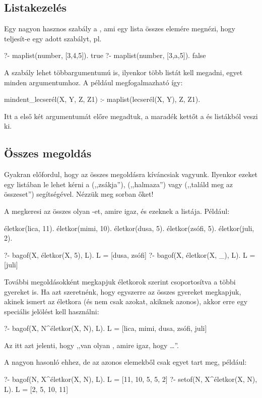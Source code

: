 \subsection*{Listakezelés}
Egy nagyon hasznos szabály a , ami egy
lista összes elemére megnézi, hogy teljesít-e egy
adott szabályt, pl.
\begin{query}
?- maplist(number, [3,4,5]).
true
?- maplist(number, [3,a,5]).
false
\end{query}
A szabály lehet többargumentumú is, ilyenkor több
listát kell megadni, egyet minden argumentumhoz. A
 például megfogalmazható így:
\begin{program}
mindent_lecserél(X, Y, Z, Z1) :-
    maplist(lecserél(X, Y), Z, Z1).
\end{program}
Itt a  első két argumentumát előre
megadtuk, a maradék kettőt a  és 
listákból veszi ki.

\subsection*{Összes megoldás}
Gyakran előfordul, hogy az összes megoldásra
kíváncsiak vagyunk. Ilyenkor ezeket egy listában le
lehet kérni a  (,,zsákja''), 
(,,halmaza'') vagy  (,,találd meg az
összeset'') segítségével. Nézzük meg sorban őket!

A  megkeresi az összes olyan
-et, amire  igaz, és  ezeknek a
listája. Például:
\begin{program}
életkor(lica, 11).
életkor(mimi, 10).
életkor(dusa, 5).
életkor(zsófi, 5).
életkor(juli, 2).
\end{program}
\begin{query}
?- bagof(X, életkor(X, 5), L).
L = [dusa, zsófi]
?- bagof(X, életkor(X, _), L).
L = [juli]
\end{query}
További megoldásokként megkapjuk életkorok szerint
csoportosítva a többi gyereket is. Ha azt
szeretnénk, hogy egyszerre az összes gyereket
megkapjuk, akinek ismert az életkora (és nem csak
azokat, akiknek azonos), akkor erre egy speciális
jelölést kell használni:
\begin{query}
?- bagof(X, N^életkor(X, N), L).
L = [lica, mimi, dusa, zsófi, juli]
\end{query}
Az  itt azt jelenti, hogy
,,van olyan , amire igaz, hogy \dots''.

A  nagyon hasonló ehhez, de az azonos
elemekből csak egyet tart meg, például:
\begin{query}
?- bagof(N, X^életkor(X, N), L).
L = [11, 10, 5, 5, 2]
?- setof(N, X^életkor(X, N), L).
L = [2, 5, 10, 11]
\end{query}

